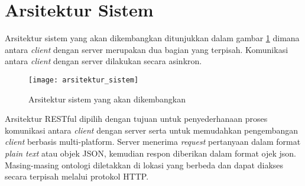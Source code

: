 \section{Arsitektur Sistem}
Arsitektur sistem yang akan dikembangkan ditunjukkan dalam gambar \ref{fig:arsitektur_sistem} dimana antara \emph{client} dengan server merupakan dua bagian yang terpisah. Komunikasi antara \emph{client} dengan server dilakukan secara asinkron. 

\begin{figure}[ht]
    \centering
    \texttt{[image: arsitektur\_sistem]}
    \caption{Arsitektur sistem yang akan dikembangkan}
    \label{fig:arsitektur_sistem}
\end{figure}

Arsitektur RESTful dipilih dengan tujuan untuk penyederhanaan proses komunikasi antara \emph{client} dengan server serta untuk memudahkan pengembangan \emph{client} berbasis multi-platform. Server menerima \emph{request} pertanyaan dalam format \emph{plain text} atau objek JSON, kemudian respon diberikan dalam format ojek json. Masing-masing ontologi diletakkan di lokasi yang berbeda dan dapat diakses secara terpisah melalui protokol HTTP.